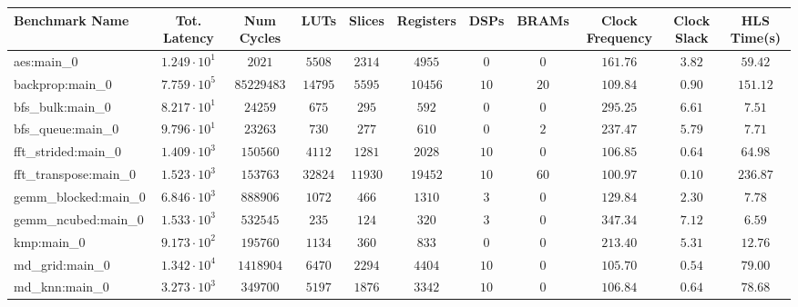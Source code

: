 \begin{tabular}{|l|c|c|c|c|c|c|c|c|c|c|}
\hline
Benchmark Name         & Tot. Latency           & Num Cycles   & LUTs      & Slices    & Registers & DSPs    & BRAMs  & Clock Frequency & Clock Slack & HLS Time(s) \\
\hline
aes:main\_0            & $ 1.249 \cdot 10^{1} $ & $ 2021     $ & $ 5508  $ & $ 2314  $ & $ 4955  $ & $ 0   $ & $ 0  $ & $ 161.76      $ & $ 3.82    $ & $ 59.42   $ \\
backprop:main\_0       & $ 7.759 \cdot 10^{5} $ & $ 85229483 $ & $ 14795 $ & $ 5595  $ & $ 10456 $ & $ 10  $ & $ 20 $ & $ 109.84      $ & $ 0.90    $ & $ 151.12  $ \\
bfs\_bulk:main\_0      & $ 8.217 \cdot 10^{1} $ & $ 24259    $ & $ 675   $ & $ 295   $ & $ 592   $ & $ 0   $ & $ 0  $ & $ 295.25      $ & $ 6.61    $ & $ 7.51    $ \\
bfs\_queue:main\_0     & $ 9.796 \cdot 10^{1} $ & $ 23263    $ & $ 730   $ & $ 277   $ & $ 610   $ & $ 0   $ & $ 2  $ & $ 237.47      $ & $ 5.79    $ & $ 7.71    $ \\
fft\_strided:main\_0   & $ 1.409 \cdot 10^{3} $ & $ 150560   $ & $ 4112  $ & $ 1281  $ & $ 2028  $ & $ 10  $ & $ 0  $ & $ 106.85      $ & $ 0.64    $ & $ 64.98   $ \\
fft\_transpose:main\_0 & $ 1.523 \cdot 10^{3} $ & $ 153763   $ & $ 32824 $ & $ 11930 $ & $ 19452 $ & $ 10  $ & $ 60 $ & $ 100.97      $ & $ 0.10    $ & $ 236.87  $ \\
gemm\_blocked:main\_0  & $ 6.846 \cdot 10^{3} $ & $ 888906   $ & $ 1072  $ & $ 466   $ & $ 1310  $ & $ 3   $ & $ 0  $ & $ 129.84      $ & $ 2.30    $ & $ 7.78    $ \\
gemm\_ncubed:main\_0   & $ 1.533 \cdot 10^{3} $ & $ 532545   $ & $ 235   $ & $ 124   $ & $ 320   $ & $ 3   $ & $ 0  $ & $ 347.34      $ & $ 7.12    $ & $ 6.59    $ \\
kmp:main\_0            & $ 9.173 \cdot 10^{2} $ & $ 195760   $ & $ 1134  $ & $ 360   $ & $ 833   $ & $ 0   $ & $ 0  $ & $ 213.40      $ & $ 5.31    $ & $ 12.76   $ \\
md\_grid:main\_0       & $ 1.342 \cdot 10^{4} $ & $ 1418904  $ & $ 6470  $ & $ 2294  $ & $ 4404  $ & $ 10  $ & $ 0  $ & $ 105.70      $ & $ 0.54    $ & $ 79.00   $ \\
md\_knn:main\_0        & $ 3.273 \cdot 10^{3} $ & $ 349700   $ & $ 5197  $ & $ 1876  $ & $ 3342  $ & $ 10  $ & $ 0  $ & $ 106.84      $ & $ 0.64    $ & $ 78.68   $ \\

\end{tabular}
